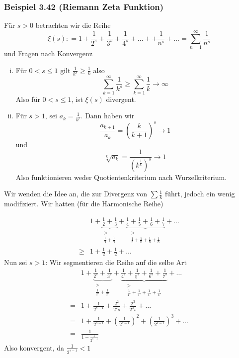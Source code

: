 \subsubsection*{Beispiel 3.42 (Riemann Zeta Funktion)}
Für $s>0$ betrachten wir die Reihe
\[\xi (s): = 1 + \frac{1}{{{2^s}}} + \frac{1}{{{3^s}}} + \frac{1}{{{4^s}}} +  \ldots  +  + \frac{1}{{{n^s}}} +  \ldots  = \sum\limits_{n = 1}^\infty  {\frac{1}{{{n^s}}}} \]
und Fragen nach Konvergenz
\begin{enumerate}[(i)]
\item Für $0<s\leq 1$ gilt $\frac{1}{{{k^s}}} \ge \frac{1}{k}$ also
\[\sum\limits_{k = 1}^\infty  {\frac{1}{{{k^s}}}}  \ge \sum\limits_{k = 1}^\infty  {\frac{1}{k}}  \to \infty \]
Also für $0<s\leq 1$, ist $\xi(s)$ divergent.
\item Für $s>1$, sei $a_k=\frac{1}{k^s}$. Dann haben wir
\[\frac{{{a_{k + 1}}}}{{{a_k}}} = {\left( {\frac{k}{{k + 1}}} \right)^s} \to 1\]
und \[\sqrt[k]{{{a_k}}} = \frac{1}{{{{\left( {{k^{\frac{1}{k}}}} \right)}^s}}} \to 1\]
Also funktionieren weder Quotientenkriterium nach Wurzelkriterium.
\end{enumerate}
Wir wenden die Idee an, die zur  Divergenz von $\sum\frac{1}{k}$ führt, jedoch ein wenig modifiziert. Wir hatten (für die Harmonische Reihe)

\begin{align*}
&1 + \underbrace {\frac{1}{2} + \frac{1}{3}}_{\begin{array}{*{20}{c}}
 > \\
{\frac{1}{4} + \frac{1}{4}}
\end{array}} + \underbrace {\frac{1}{4} + \frac{1}{5} + \frac{1}{6} + \frac{1}{7}}_{\begin{array}{*{20}{c}}
 > \\
{\frac{1}{8} + \frac{1}{8} + \frac{1}{8} + \frac{1}{8}}
\end{array}} +  \ldots \\
 \ge&1 + \frac{1}{2} + \frac{1}{2} +  \ldots
\end{align*}
Nun sei $s>1$: Wir segmentieren die Reihe auf die selbe Art
\begin{align*}
&1 + \underbrace {\frac{1}{{{2^s}}} + \frac{1}{{{3^s}}}}_{\begin{array}{*{20}{c}}
 > \\
{\frac{1}{{{2^s}}} + \frac{1}{{{2^s}}}}
\end{array}} + \underbrace {\frac{1}{{{4^s}}} + \frac{1}{{{5^s}}} + \frac{1}{{{6^s}}} + \frac{1}{{{7^s}}}}_{\begin{array}{*{20}{c}}
 > \\
{\frac{1}{{{4^s}}} + \frac{1}{{{4^s}}} + \frac{1}{{{4^s}}} + \frac{1}{{{4^s}}}}
\end{array}} +  \ldots \\
=&1 + \frac{1}{{{2^{s - 1}}}} + \frac{{{2^2}}}{{{2^2}s}} + \frac{{{2^3}}}{{{2^3}s}} +  \ldots \\
=&1 + \frac{1}{{{2^{s - 1}}}} + {\left( {\frac{1}{{{2^{s - 1}}}}} \right)^2} + {\left( {\frac{1}{{{2^{s - 1}}}}} \right)^3} +  \ldots \\
=&\frac{1}{{1 - \frac{1}{{{2^{s - 1}}}}}}
\end{align*}
Also konvergent, da $\frac{1}{{{2^{s - 1}}}} < 1$

